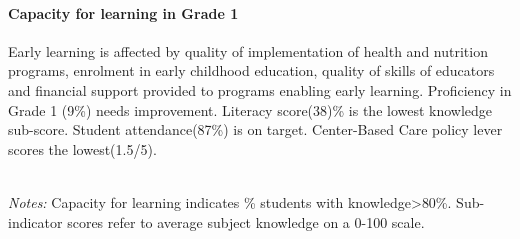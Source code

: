 \documentclass[twocolumn]{article}
\let\oldparagraph\paragraph
\renewcommand{\paragraph}[1]{\oldparagraph{#1}\mbox{}}
\begin{document}
\hypertarget{capacity-for-learning-in-grade-1}{%
\paragraph{\texorpdfstring{\textbf{Capacity for learning in Grade
1}}{Capacity for learning in Grade 1}}\label{capacity-for-learning-in-grade-1}}

Early learning is affected by quality of implementation of health and
nutrition programs, enrolment in early childhood education, quality of
skills of educators and financial support provided to programs enabling
early learning. Proficiency in Grade 1 (9\%) needs improvement. Literacy
score(38)\% is the lowest knowledge sub-score. Student attendance(87\%)
is on target. Center-Based Care policy lever scores the lowest(1.5/5).
\vfill\null

\begin{table}[H]
\\
\color{darkgray}\scriptsize{\textit{Notes:} Capacity for learning indicates \% students with knowledge\textgreater{80\%}. Sub-indicator scores refer to average subject knowledge on a 0-100 scale.}
\end{table}
\raggedbottom
\end{document}
